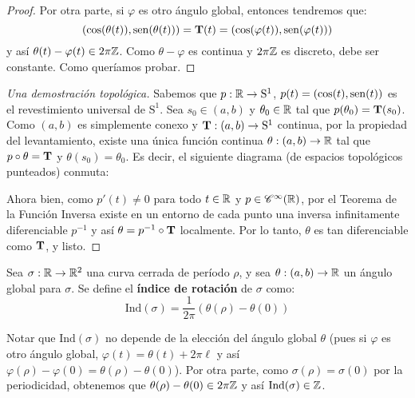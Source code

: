 \begin{prop}
\begin{proof}
Por otra parte, si $\varphi$ es otro ángulo global, entonces tendremos que: $$(\cos(\theta(t)),\operatorname{sen}(\theta(t)))=\operatorname{\mathbf{T}}(t)=(\cos(\varphi(t)),\operatorname{sen}(\varphi(t)))$$ y así $\theta(t)-\varphi(t)\in 2\pi\mathbb{Z}$. Como $\theta-\varphi$ es continua y $2\pi\mathbb{Z}$ es discreto, debe ser constante. Como queríamos probar.
\end{proof}
\begin{proof}[Una demostración topológica]
Sabemos que $p:\mathbb{R}\to\mathrm{S}^1$, $p(t)=(\cos(t),\operatorname{sen}(t))$ es el revestimiento universal de $\mathrm{S}^1$. Sea $s_0\in(a,b)$ y $\theta_0\in\mathbb{R}$ tal que $p(\theta_0)=\operatorname{\mathbf{T}}(s_0)$. Como $(a,b)$ es simplemente conexo y $\operatorname{\mathbf{T}}:(a,b)\to\mathrm{S}^1$ continua, por la propiedad del levantamiento, existe una única función continua $\theta:(a,b)\to\mathbb{R}$ tal que $p\circ\theta=\operatorname{\mathbf{T}}$ y $\theta(s_0)=\theta_0$. Es decir, el siguiente diagrama (de espacios topológicos punteados) conmuta:
\begin{center}
\end{center}
Ahora bien, como $p'(t)\neq 0$ para todo $t\in\mathbb{R}$ y $p\in\mathscr{C}^\infty(\mathbb{R})$, por el Teorema de la Función Inversa existe en un entorno de cada punto una inversa infinitamente diferenciable $p^{-1}$ y así $\theta=p^{-1}\circ\operatorname{\mathbf{T}}$ localmente. Por lo tanto, $\theta$ es tan diferenciable como $\operatorname{\mathbf{T}}$, y listo.
\end{proof}
\end{prop}

\begin{defn}
Sea $\sigma:\mathbb{R}\to\mathbb{R}^2$ una curva cerrada de período $\rho$, y sea $\theta:(a,b)\to\mathbb{R}$ un ángulo global para $\sigma$. Se define el \textbf{índice de rotación} de $\sigma$ como: $$\mathrm{Ind}(\sigma)=\dfrac{1}{2\pi}(\theta(\rho)-\theta(0))$$
\end{defn}

\begin{obs}
Notar que $\mathrm{Ind}(\sigma)$ no depende de la elección del ángulo global $\theta$ (pues si $\varphi$ es otro ángulo global, $\varphi(t)=\theta(t)+2\pi\ell$ y así $\varphi(\rho)-\varphi(0)=\theta(\rho)-\theta(0)$). Por otra parte, como $\sigma(\rho)=\sigma(0)$ por la periodicidad, obtenemos que $\theta(\rho)-\theta(0)\in 2\pi\mathbb{Z}$ y así $\mathrm{Ind}(\sigma)\in\mathbb{Z}$.
\end{obs}

